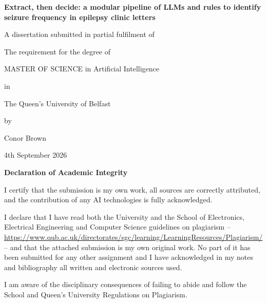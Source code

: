 \documentclass[conference]{IEEEtran}
\begin{document}
\begin{titlepage}
    \centering

    {\Huge\bfseries Extract, then decide: a modular pipeline of LLMs and rules to identify seizure frequency in epilepsy clinic letters \par}
    \vspace{5cm}

    {\large
    A dissertation submitted in partial fulfilment of\par
    The requirement for the degree of\par
    MASTER OF SCIENCE in Artificial Intelligence\par
    in\par
    \par
    The Queen’s University of Belfast\par
    by\par
    Conor Brown\par
    4th September 2026
    }
\end{titlepage}

\onecolumn
\thispagestyle{empty}

\begin{center}
{\Large\bfseries Declaration of Academic Integrity}
\end{center}

\vspace{8pt}

\noindent
I certify that the submission is my own work, all sources are
correctly attributed, and the contribution of any AI technologies
is fully acknowledged.

\vspace{6pt}

\noindent
I declare that I have read both the University and the School of
Electronics, Electrical Engineering and Computer Science guidelines
on plagiarism --
\url{https://www.qub.ac.uk/directorates/sgc/learning/LearningResources/Plagiarism/}
-- and that the attached submission is my own original work. No part
of it has been submitted for any other assignment and I have
acknowledged in my notes and bibliography all written and electronic
sources used.

\vspace{6pt}

\noindent
I am aware of the disciplinary consequences of failing to abide and
follow the School and Queen's University Regulations on Plagiarism.

\vspace{18pt}
\end{document}

